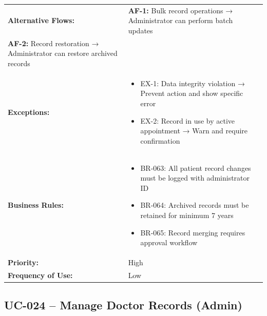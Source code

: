 \documentclass[12pt,a4paper]{article}
\begin{document}
\begin{longtable}{|p{4.5cm}|p{10.5cm}|}
\hline
\textbf{Alternative Flows:} &
\textbf{AF-1:} Bulk record operations → Administrator can perform batch updates \\
\textbf{AF-2:} Record restoration → Administrator can restore archived records \\
\hline
\textbf{Exceptions:} &
\begin{itemize}
  \item EX-1: Data integrity violation → Prevent action and show specific error
  \item EX-2: Record in use by active appointment → Warn and require confirmation
\end{itemize} \\
\hline
\textbf{Business Rules:} &
\begin{itemize}
  \item BR-063: All patient record changes must be logged with administrator ID
  \item BR-064: Archived records must be retained for minimum 7 years
  \item BR-065: Record merging requires approval workflow
\end{itemize} \\
\hline
\textbf{Priority:} & High \\
\hline
\textbf{Frequency of Use:} & Low \\
\hline
\end{longtable}

\subsection{UC-024 – Manage Doctor Records (Admin)}
\end{document}
